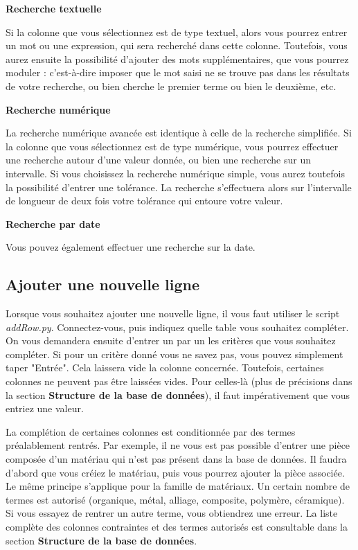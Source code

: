 \documentclass[12pt,a4paper]{article}
\begin{document}
        \medskip
        \textbf{Recherche textuelle}

        Si la colonne que vous sélectionnez est de type textuel, alors vous pourrez entrer un mot ou une expression, qui sera recherché
        dans cette colonne. Toutefois, vous aurez ensuite la possibilité d'ajouter des mots supplémentaires, que vous pourrez moduler :
        c'est-à-dire imposer que le mot saisi ne se trouve pas dans les résultats de votre recherche, ou bien cherche le premier terme
        ou bien le deuxième, etc.
        
        \medskip
        \textbf{Recherche numérique}
        
        La recherche numérique avancée est identique à celle de la recherche simplifiée.
        Si la colonne que vous sélectionnez est de type numérique, vous pourrez effectuer une recherche autour d'une valeur donnée,
        ou bien une recherche sur un intervalle. Si vous choisissez la recherche numérique simple, vous aurez toutefois
        la possibilité d'entrer une tolérance. La recherche s'effectuera alors sur l'intervalle de longueur de deux fois votre tolérance
        qui entoure votre valeur.

        \medskip
        \textbf{Recherche par date}
        
        Vous pouvez également effectuer une recherche sur la date.


\bigskip
\subsection{Ajouter une nouvelle ligne}

    Lorsque vous souhaitez ajouter une nouvelle ligne, il vous faut utiliser le script \emph{addRow.py}.
    Connectez-vous, puis indiquez quelle table vous souhaitez compléter.
    On vous demandera ensuite d'entrer un par un les critères que vous souhaitez compléter.
    Si pour un critère donné vous ne savez pas, vous pouvez simplement taper "Entrée".
    Cela laissera vide la colonne concernée.
    Toutefois, certaines colonnes ne peuvent pas être laissées vides. Pour celles-là (plus de précisions dans
    la section \textbf{Structure de la base de données}), il faut impérativement que vous entriez une valeur.

    La complétion de certaines colonnes est conditionnée par des termes préalablement rentrés. Par exemple,
    il ne vous est pas possible d'entrer une pièce composée d'un matériau qui n'est pas présent dans la base
    de données. Il faudra d'abord que vous créiez le matériau, puis vous pourrez ajouter la pièce associée.
    Le même principe s'applique pour la famille de matériaux. Un certain nombre de termes est autorisé (organique,
    métal, alliage, composite, polymère, céramique). Si vous essayez de rentrer un autre terme, vous obtiendrez une
    erreur. La liste complète des colonnes contraintes et des termes autorisés est consultable dans la section
    \textbf{Structure de la base de données}.
\end{document}
